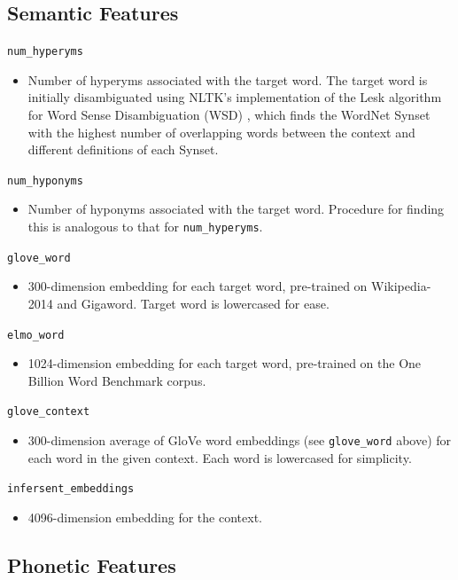 \documentclass[11pt,a4paper]{article}
\begin{document}
\subsection{Semantic Features}

\texttt{num\_hyperyms}
\begin{itemize}
  \item Number of hyperyms associated with the target word. The target word is initially disambiguated using NLTK's implementation of the Lesk algorithm for Word Sense Disambiguation (WSD) \citep{lesk1986automatic}, which finds the WordNet Synset with the highest number of overlapping words between the context and different definitions of each Synset.
\end{itemize}
\texttt{num\_hyponyms}
\begin{itemize}
  \item Number of hyponyms associated with the target word. Procedure for finding this is analogous to that for \texttt{num\_hyperyms}.
\end{itemize}
\texttt{glove\_word}
\begin{itemize}
  \item 300-dimension embedding for each target word, pre-trained on Wikipedia-2014 and Gigaword. Target word is lowercased for ease.
\end{itemize}
\texttt{elmo\_word}
\begin{itemize}
  \item 1024-dimension embedding for each target word, pre-trained on the One Billion Word Benchmark corpus.
\end{itemize}
\texttt{glove\_context}
\begin{itemize}
  \item 300-dimension average of GloVe word embeddings (see \texttt{glove\_word} above) for each word in the given context. Each word is lowercased for simplicity.
\end{itemize}
\texttt{infersent\_embeddings}
\begin{itemize}
  \item 4096-dimension embedding for the context.
\end{itemize}

\subsection{Phonetic Features}
\end{document}
